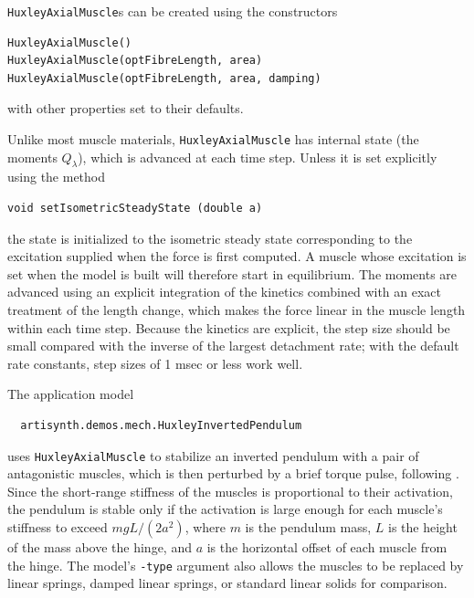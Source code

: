 {\tt HuxleyAxialMuscle}s can be created using the constructors
\begin{lstlisting}[]
HuxleyAxialMuscle()
HuxleyAxialMuscle(optFibreLength, area)
HuxleyAxialMuscle(optFibreLength, area, damping)
\end{lstlisting}
%
with other properties set to their defaults.

Unlike most muscle materials, {\tt HuxleyAxialMuscle} has internal
state (the moments $Q_\lambda$), which is advanced at each time step.
Unless it is set explicitly using the method
%
\begin{lstlisting}[]
  void setIsometricSteadyState (double a)
\end{lstlisting}
%
the state is initialized to the isometric steady state corresponding
to the excitation supplied when the force is first computed. A muscle
whose excitation is set when the model is built will therefore start
in equilibrium. The moments are advanced using an explicit integration
of the kinetics combined with an exact treatment of the length change,
which makes the force linear in the muscle length within each time
step. Because the kinetics are explicit, the step size should be small
compared with the inverse of the largest detachment rate; with the
default rate constants, step sizes of 1 msec or less work well.

The application model
%
\begin{verbatim}
  artisynth.demos.mech.HuxleyInvertedPendulum
\end{verbatim}
%
uses {\tt HuxleyAxialMuscle} to stabilize an inverted pendulum with a
pair of antagonistic muscles, which is then perturbed by a brief
torque pulse, following \cite{barrett2024muscle}. Since the short-range stiffness of the muscles is
proportional to their activation, the pendulum is stable only if the
activation is large enough for each muscle's stiffness to exceed $m g
L / (2 a^2)$, where $m$ is the pendulum mass, $L$ is the height of the
mass above the hinge, and $a$ is the horizontal offset of each muscle
from the hinge. The model's {\tt -type} argument also allows the
muscles to be replaced by linear springs, damped linear springs, or
standard linear solids for comparison.


